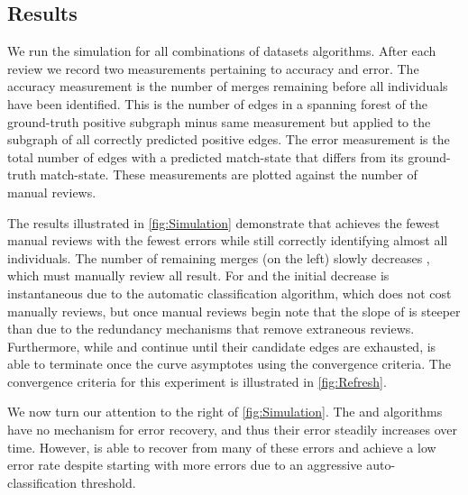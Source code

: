     \subsection{Results}

    We run the simulation for all combinations of datasets algorithms.
    After each review we record two measurements pertaining to accuracy and error.
    The accuracy measurement is the number of merges remaining before all individuals have been identified.
    This is the number of edges in a spanning forest of the ground-truth positive subgraph minus same measurement
      but applied to the subgraph of all correctly predicted positive edges.
    The error measurement is the total number of edges with a predicted match-state that differs from its
      ground-truth match-state.
    These measurements are plotted against the number of manual reviews.

    \Simulation{}

    \Refresh{}

    The results illustrated in \cref{fig:Simulation} demonstrate that  achieves the fewest manual
      reviews with the fewest errors while still correctly identifying almost all individuals.
    The number of remaining merges (on the left) slowly decreases , which must manually review all
      result.
    For  and  the initial decrease is instantaneous due to the automatic
      classification algorithm, which does not cost manually reviews, but once manual reviews begin note that the
      slope of  is steeper than  due to the redundancy mechanisms that remove extraneous
      reviews.
    Furthermore, while  and  continue until their candidate edges are exhausted,
       is able to terminate once the curve asymptotes using the convergence criteria.
    The convergence criteria for this experiment is illustrated in \cref{fig:Refresh}.

    We now turn our attention to the right of \cref{fig:Simulation}.
    The  and  algorithms have no mechanism for error recovery, and thus their error
      steadily increases over time.
    However,  is able to recover from many of these errors and achieve a low error rate despite
      starting with more errors due to an aggressive auto-classification threshold.

